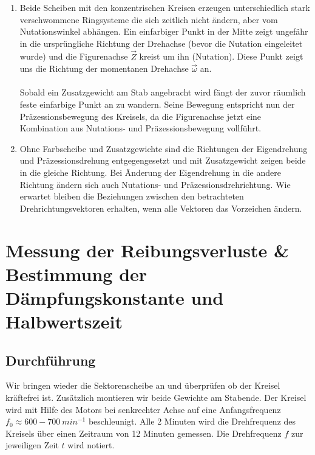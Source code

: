 \documentclass[a4paper,10pt]{article}
\begin{document}
\begin{enumerate}[label=(\alph*)]
\item Beide Scheiben mit den konzentrischen Kreisen erzeugen unterschiedlich stark verschwommene Ringsysteme die sich zeitlich nicht ändern, aber vom Nutationswinkel abhängen. Ein einfarbiger Punkt in der Mitte zeigt ungefähr in die ursprüngliche Richtung der Drehachse (bevor die Nutation eingeleitet wurde) und die 
Figurenachse \(\vec{Z}\) kreist um ihn  (Nutation). Diese Punkt zeigt uns die Richtung der momentanen Drehachse \(\vec{\omega}\) an.\\\\
Sobald ein Zusatzgewicht am Stab angebracht wird fängt der zuvor räumlich feste einfarbige Punkt an zu wandern. Seine Bewegung entspricht nun der Präzessionsbewegung des Kreisels, da die Figurenachse jetzt eine Kombination aus Nutations- und Präzessionsbewegung vollführt.
\item Ohne Farbscheibe und Zusatzgewichte sind die Richtungen der Eigendrehung und Präzessionsdrehung entgegengesetzt und mit Zusatzgewicht zeigen beide in die gleiche Richtung. Bei Änderung der Eigendrehung in die andere Richtung ändern sich auch Nutations-  und Präzessionsdrehrichtung. Wie erwartet bleiben die Beziehungen zwischen den betrachteten Drehrichtungsvektoren erhalten, wenn alle Vektoren das Vorzeichen ändern.

\end{enumerate}
\section{Messung der Reibungsverluste \& Bestimmung der Dämpfungskonstante und Halbwertszeit}
\subsection[Durchführung]{Durchführung\fnrefb}
Wir bringen wieder die Sektorenscheibe an und überprüfen ob der Kreisel kräftefrei ist. Zusätzlich montieren wir beide Gewichte am Stabende.
Der Kreisel wird mit Hilfe des Motors bei senkrechter Achse auf eine Anfangsfrequenz \(f_{0}\approx600-700\:{min}^{-1}\) beschleunigt.  Alle 2 Minuten wird die Drehfrequenz des Kreisels über einen Zeitraum von 12 Minuten gemessen. Die Drehfrequenz \(f\) zur jeweiligen Zeit \(t\) wird notiert.
\end{document}
